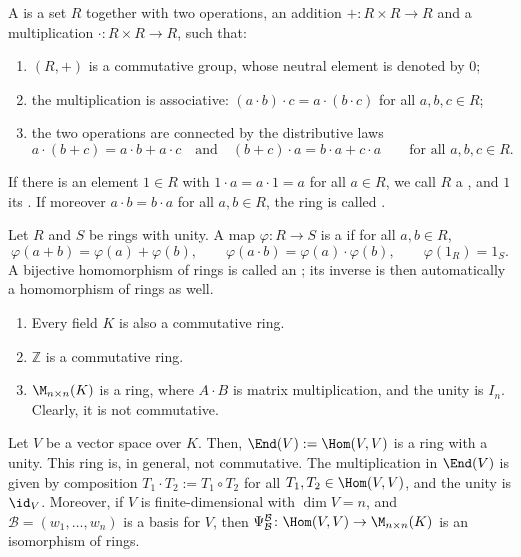 \begin{aidefinition}[Ring]
\label{aidef:ring}
A  is a set $R$ together with two operations, an addition $+ \colon R \times R \to R$ and a multiplication $\cdot \colon R \times R \to R$, such that:
\begin{enumerate}[label=\textbf{(\alph*)}]
    \item $(R, +)$ is a commutative group, whose neutral element is denoted by $0$;
    \item the multiplication is associative: $(a \cdot b) \cdot c = a \cdot (b \cdot c)$ for all $a, b, c \in R$;
    \item the two operations are connected by the distributive laws
    \[
    a \cdot (b + c) = a \cdot b + a \cdot c \quad \text{and} \quad (b + c) \cdot a = b \cdot a + c \cdot a \qquad \text{for all } a,b,c \in R.
    \]
\end{enumerate}
If there is an element $1 \in R$ with $1 \cdot a = a \cdot 1 = a$ for all $a \in R$, we call $R$ a , and $1$ its . If moreover $a \cdot b = b \cdot a$ for all $a, b \in R$, the ring is called .
\end{aidefinition}

\begin{aidefinition}
\label{aidef:ring_homomorphism}
Let $R$ and $S$ be rings with unity. A map $\varphi \colon R \to S$ is a  if for all $a, b \in R$,
\[
\varphi(a + b) = \varphi(a) + \varphi(b), \qquad \varphi(a \cdot b) = \varphi(a) \cdot \varphi(b), \qquad \varphi(1_R) = 1_S.
\]
A bijective homomorphism of rings is called an ; its inverse is then automatically a homomorphism of rings as well.
\end{aidefinition}

\begin{example}
  \begin{enumerate}
    \item Every field $K$ is also a commutative ring.
    \item $\mathbb{Z}$ is a commutative ring.
    \item $\M_{n \times n}(K)$ is a ring, where $A \cdot B$ is matrix multiplication, and the unity is $I_n$. Clearly, it is not commutative.
  \end{enumerate}
\end{example}

\begin{corollary}
  \label{cor:endomorphism_ring}
  Let $V$ be a vector space over $K$. Then, $\End(V) := \Hom(V,V)$ is a ring with a unity. This ring is, in general, not commutative. The multiplication in $\End(V)$ is given by composition $T_1 \cdot T_2 := T_1 \circ T_2$ for all $T_1, T_2 \in \Hom(V,V)$, and the unity is $\id_V$. Moreover, if $V$ is finite-di\-men\-sional with $\dim V = n$, and $\mathcal{B} = (w_1, \dots, w_n)$ is a basis for $V$, then $\Psi_{\mathcal{B}}^{\mathcal{B}} \colon \Hom(V,V) \to \M_{n \times n}(K)$ is an isomorphism of rings.
\end{corollary}

